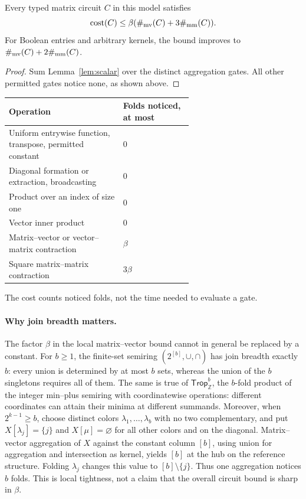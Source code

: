 \begin{lemma}\label{lem:typed-cost}
Every typed matrix circuit $C$ in this model satisfies
\[
 \operatorname{cost}(C)\le\beta(\#_{\mathrm{mv}}(C)+3\#_{\mathrm{mm}}(C)).
\]
For Boolean entries and arbitrary kernels, the bound improves to
$\#_{\mathrm{mv}}(C)+2\#_{\mathrm{mm}}(C)$.
\end{lemma}
\begin{proof}
Sum Lemma~\ref{lem:scalar} over the distinct aggregation gates.
All other permitted gates notice none, as shown above.
\end{proof}
\begin{center}
\renewcommand{\arraystretch}{1.1}
\begin{tabular}{p{0.62\linewidth}l}
\toprule
Operation & Folds noticed, at most\\
\midrule
Uniform entrywise function, transpose, permitted constant & $0$\\
Diagonal formation or extraction, broadcasting & $0$\\
Product over an index of size one & $0$\\
Vector inner product & $0$\\
Matrix--vector or vector--matrix contraction & $\beta$\\
Square matrix--matrix contraction & $3\beta$\\
\bottomrule
\end{tabular}
\end{center}
The cost counts noticed folds, not the time needed to evaluate a gate.

\paragraph{Why join breadth matters.}
The factor $\beta$ in the local matrix--vector bound cannot in
general be replaced by a constant. For $b\ge1$, the finite-set
semiring $(2^{[b]},\cup,\cap)$ has join breadth exactly $b$:
every union is determined by at most $b$ sets, whereas the union
of the $b$ singletons requires all of them. The same is true of $\mathsf{Trop}_{\mathbb Z}^{b}$, the $b$-fold
product of the integer min--plus semiring with coordinatewise
operations: different coordinates can attain their minima at
different summands.
Moreover, when $2^{k-1}\ge b$, choose distinct colors
$\lambda_1,\ldots,\lambda_b$ with no two complementary, and put
$X[\lambda_j]=\{j\}$ and $X[\mu]=\varnothing$ for all other
colors and on the diagonal. Matrix--vector aggregation of $X$
against the constant column $[b]$, using union for aggregation
and intersection as kernel, yields $[b]$ at the hub on the
reference structure. Folding $\lambda_j$ changes this value to
$[b]\setminus\{j\}$. Thus one aggregation notices $b$ folds.
This is local tightness, not a claim that the overall circuit bound
is sharp in $\beta$.

